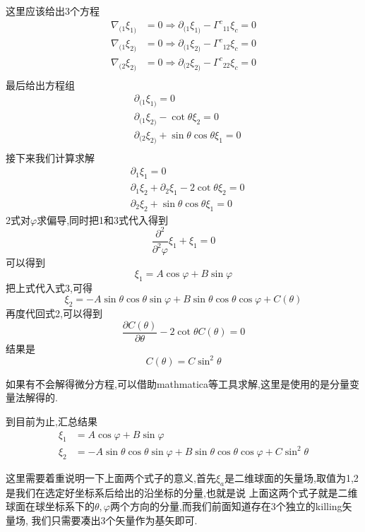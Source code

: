 \documentclass[../main.tex]{subfiles}
\begin{document}
这里应该给出3个方程
\begin{align*}
	\nabla_{(1}\xi_{1)} & = 0 \Rightarrow \partial_{(1}\xi_{1)} - \Gamma^{c}{}_{11}\xi_c = 0  \\
	\nabla_{(1}\xi_{2)} & = 0 \Rightarrow  \partial_{(1}\xi_{2)} - \Gamma^{c}{}_{12}\xi_c = 0 \\
	\nabla_{(2}\xi_{2)} & = 0 \Rightarrow  \partial_{(2}\xi_{2)} - \Gamma^{c}{}_{22}\xi_c = 0 \\
\end{align*}
最后给出方程组
\begin{align*}
	 & \partial_{(1}\xi_{1)} = 0                                 \\
	 & \partial_{(1}\xi_{2)} - \cot \theta \xi_2 = 0             \\
	 & \partial_{(2}\xi_{2)} + \sin \theta \cos \theta \xi_1 = 0 \\
\end{align*}
接下来我们计算求解
\begin{align}
	 & \partial_{1}\xi_{1} = 0                                          \\
	 & \partial_{1}\xi_{2}+ \partial_{2}\xi_{1}-2 \cot \theta \xi_2 = 0 \\
	 & \partial_{2}\xi_{2} + \sin \theta \cos \theta \xi_1 = 0
\end{align}
2式对$\varphi$求偏导,同时把1和3式代入得到
$$
	\frac{\partial^2}{\partial^2 \varphi} \xi_1 + \xi_1 = 0
$$
可以得到$$
	\xi_1 = A\cos \varphi + B \sin \varphi$$
把上式代入式3,可得$$
	\xi_2 = -A \sin \theta \cos \theta \sin \varphi + B \sin \theta \cos \theta \cos \varphi + C(\theta)$$
再度代回式2,可以得到$$
	\frac{\partial C(\theta)}{\partial \theta} - 2\cot \theta C(\theta) = 0$$
结果是$$
	C(\theta) = C \sin^2 \theta$$
\begin{note}
	如果有不会解得微分方程,可以借助mathmatica等工具求解,这里是使用的是分量变量法解得的.
\end{note}
到目前为止,汇总结果\begin{align*}
	\xi_1 & = A\cos \varphi + B \sin \varphi                                                                    \\
	\xi_2 & =- A \sin \theta \cos \theta \sin \varphi + B \sin \theta \cos \theta \cos \varphi + C\sin^2 \theta
\end{align*}
\begin{note}
	这里需要着重说明一下上面两个式子的意义,首先$\xi_a$是二维球面的矢量场,取值为1,2是我们在选定好坐标系后给出的沿坐标的分量,也就是说
	上面这两个式子就是二维球面在球坐标系下的$\theta ,\varphi$两个方向的分量,而我们前面知道存在3个独立的killing矢量场,
	我们只需要凑出3个矢量作为基矢即可.
\end{note}
\end{document}
